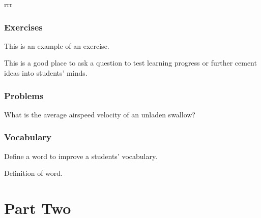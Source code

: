 \documentclass[11pt,fleqn,twoside]{book} %
\begin{document}
\begin{example}
    rrr
\end{example}


\section{Exercises}

This is an example of an exercise.

\begin{exercise}
    This is a good place to ask a question to test learning progress or further cement ideas into students' minds.
\end{exercise}


\section{Problems}

\begin{problem}
What is the average airspeed velocity of an unladen swallow?
\end{problem}


\section{Vocabulary}

Define a word to improve a students' vocabulary.

\begin{vocabulary}[Word]
    Definition of word.
\end{vocabulary}


\part{Part Two}

\end{document}
